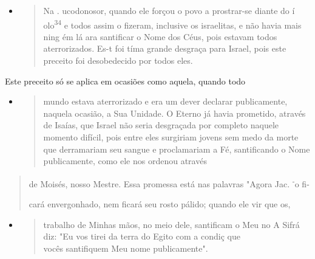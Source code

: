 \begin{itemize}
\item
  \begin{quote}
  Na . ucodonosor, quando ele forçou o povo a prostrar-se diante do í
  olo\textsuperscript{34} e todos assim o fizeram, inclusive os
  israelitas, e não havia mais nin­g ém lá ara santificar o Nome dos
  Céus, pois estavam todos aterrorizados. Es-t foi tíma grande desgraça
  para Israel, pois este preceito foi desobedecido por todos eles.
  \end{quote}
\end{itemize}

Este preceito só se aplica em ocasiões como aquela, quando todo

\begin{itemize}
\item
  \begin{quote}
  mundo estava aterrorizado e era um dever declarar publicamente,
  naquela ocasião, a Sua Unidade. O Eterno já havia prometido, através
  de Isaías, que Is­rael não seria desgraçada por completo naquele
  momento difícil, pois entre eles surgiriam jovens sem medo da morte
  que derramariam seu sangue e proclama­riam a Fé, santificando o Nome
  publicamente, como ele nos ordenou através
  \end{quote}
\end{itemize}

\begin{quote}
de Moisés, nosso Mestre. Essa promessa está nas palavras "Agora Jac.
\textsuperscript{-}o fi-

cará envergonhado, nem ficará seu rosto pálido; quando ele vir que os,
\end{quote}

\begin{itemize}
\item
  \begin{quote}
  trabalho de Minhas mãos, no meio dele, santificam o Meu no A Sifrá
  diz: "Eu vos tirei da terra do Egito com a condiç que\\
  vocês santifiquem Meu nome publicamente".
  \end{quote}
\end{itemize}

